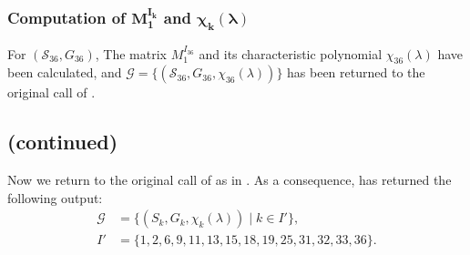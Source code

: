 \documentclass{birkjour}
\theoremstyle{plain}
\theoremstyle{definition}
\begin{document}

    \subsubsection{Computation of $\bm{M_1^{I_{k}}}$ and $\bm{\chi_k(\lambda)}$}

    For $(\mathcal{S}_{36},G_{36})$, The matrix $M_1^{I_{36}}$ and its characteristic polynomial 
    $\chi_{36}(\lambda)$ have been calculated, 
    and $\mathcal{G}=\{(\mathcal{S}_{36},G_{36},\chi_{36}(\lambda))\}$ has been returned to
    the original call of .

    \subsection{ (continued)}

    Now we return to the original call of  
    as in .
    As a consequence,  has returned the following output:
    \begin{equation}
        \label{eq:preprocessing-output}
        \begin{split}
            \mathcal{G} &=
            \{(S_{k},G_{k},\chi_k(\lambda))\mid k\in I'\}, \\
            I' &= \{1,2,6,9,11,13,15,18,19,25,31,32,33,36\}.
        \end{split}
    \end{equation}



    \subsection{}
    \label{sec:main}
\end{document}
